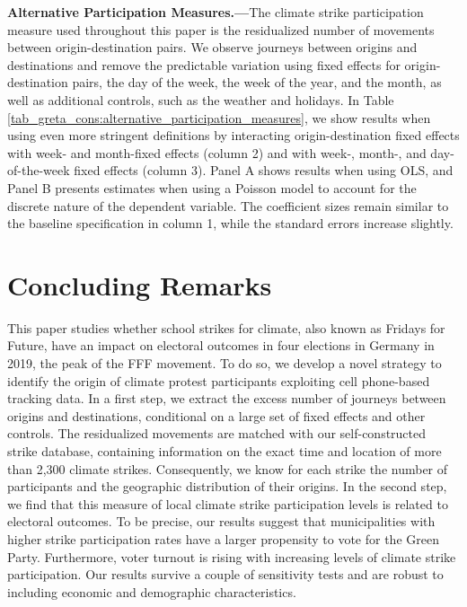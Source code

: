 \textbf{Alternative Participation Measures.---}The climate strike participation measure used throughout this paper is the residualized number of movements between origin-destination pairs. We observe journeys between origins and destinations and remove the predictable variation using fixed effects for origin-destination pairs, the day of the week, the week of the year, and the month, as well as additional controls, such as the weather and holidays. In Table \ref{tab_greta_cons:alternative_participation_measures}, we show results when using even more stringent definitions by interacting origin-destination fixed effects with week- and month-fixed effects (column 2) and with week-, month-, and day-of-the-week fixed effects (column 3). Panel A shows results when using OLS, and Panel B presents estimates when using a Poisson model to account for the discrete nature of the dependent variable. The coefficient sizes remain similar to the baseline specification in column 1, while the standard errors increase slightly.













\bigskip
\section{Concluding Remarks}\label{sec_greta_cons:conclusion}

This paper studies whether school strikes for climate, also known as Fridays for Future, have an impact on electoral outcomes in four elections in Germany in 2019, the peak of the FFF movement. To do so, we develop a novel strategy to identify the origin of climate protest participants exploiting cell phone-based tracking data. In a first step, we extract the excess number of journeys between origins and destinations, conditional on a large set of fixed effects and other controls. The residualized movements are matched with our self-constructed strike database, containing information on the exact time and location of more than 2,300 climate strikes. Consequently, we know for each strike the number of participants and the geographic distribution of their origins. In the second step, we find that this measure of local climate strike participation levels is related to electoral outcomes. To be precise, our results suggest that municipalities with higher strike participation rates have a larger propensity to vote for the Green Party. Furthermore, voter turnout is rising with increasing levels of climate strike participation. Our results survive a couple of sensitivity tests and are robust to including economic and demographic characteristics.





